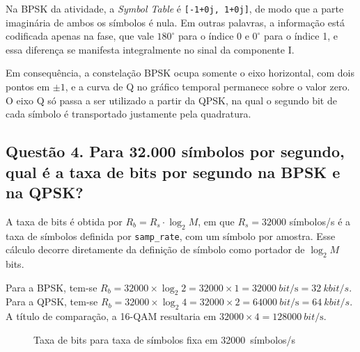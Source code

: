 Na BPSK da atividade, a \textit{Symbol Table} é \texttt{[-1+0j, 1+0j]}, de modo que a parte imaginária de ambos os símbolos é nula. Em outras palavras, a informação está codificada apenas na fase, que vale $180^\circ$ para o índice 0 e $0^\circ$ para o índice 1, e essa diferença se manifesta integralmente no sinal da componente I.

Em consequência, a constelação BPSK ocupa somente o eixo horizontal, com dois pontos em $\pm 1$, e a curva de Q no gráfico temporal permanece sobre o valor zero. O eixo Q só passa a ser utilizado a partir da QPSK, na qual o segundo bit de cada símbolo é transportado justamente pela quadratura.

\subsection*{Questão 4. Para 32.000 símbolos por segundo, qual é a taxa de bits por segundo na BPSK e na QPSK?}

A taxa de bits é obtida por $R_b = R_s \cdot \log_2 M$, em que $R_s=\num{32000}$ símbolos/s é a taxa de símbolos definida por \texttt{samp\_rate}, com um símbolo por amostra. Esse cálculo decorre diretamente da definição de símbolo como portador de $\log_2 M$ bits.

Para a BPSK, tem-se $R_b = 32000 \times \log_2 2 = 32000 \times 1 = \SI{32000}{bit\per\second} = \SI{32}{kbit/s}$. Para a QPSK, tem-se $R_b = 32000 \times \log_2 4 = 32000 \times 2 = \SI{64000}{bit\per\second} = \SI{64}{kbit/s}$. A título de comparação, a 16-QAM resultaria em $32000\times 4=\SI{128000}{bit\per\second}$.

\begin{figure}[H]
\centering
{}
\caption{Taxa de bits para taxa de símbolos fixa em \num{32000}~símbolos/s}\label{fig:q4}
\end{figure}

